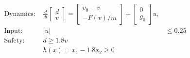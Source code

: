 \documentclass[preview]{standalone}
\begin{document}
\begin{align*}
\text{Dynamics: } & \frac{d}{dt}\begin{bmatrix}d\\ v\end{bmatrix} = \begin{bmatrix}v_0 - v\\ -F(v)/m\end{bmatrix} + \begin{bmatrix}0\\g_0\end{bmatrix}u, \\ \text{Input: } & |u| &\leq 0.25\\ \text{Safety: } & d \geq 1.8 v\\ &h(x) = x_1 - 1.8 x_2 \geq 0
\end{align*}
\end{document}
